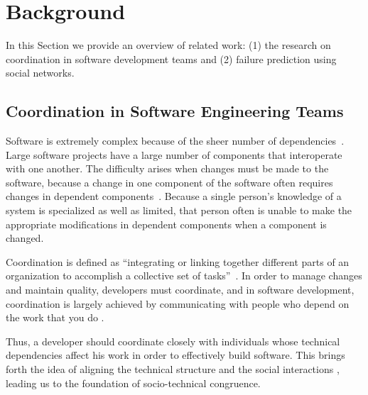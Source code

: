 \section{Background}
\label{chap:bg}
In this Section we provide an overview of related work: (1) the research on coordination in software development teams and (2) failure prediction using social networks.

\subsection{Coordination in Software Engineering Teams}
Software is extremely complex because of the sheer number of dependencies~\cite{sawyer2004:teams}.
Large software projects have a large number of components that interoperate with one another.
The difficulty arises when changes must be made to the software, because a change in one component of the software often requires changes in dependent components~\cite{desouza:2008}. Because a single person's knowledge of a system is specialized as well as limited, that person often is unable to make the appropriate modifications in dependent components when a component is changed.

Coordination is defined as ``integrating or linking together different parts of an organization to accomplish a collective set of tasks''~\cite{vandeven1976}. In order to manage changes and maintain quality, developers must coordinate, and in software development, coordination is largely achieved by communicating with people who depend on the work that you do \cite{kraut:1995coordination}.

Thus, a developer should coordinate closely with individuals whose technical dependencies affect his work in order to effectively build software. This brings forth the idea of aligning the technical structure and the social interactions \cite{herbsleb2007:fose}, leading us to the foundation of socio-technical congruence.



